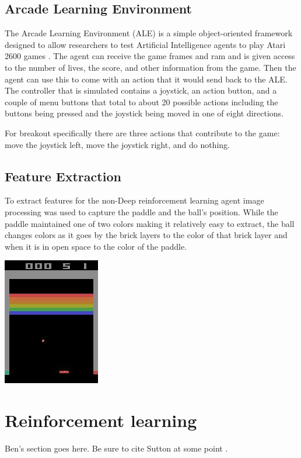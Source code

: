\documentclass{article}
\begin{document}
\subsection{Arcade Learning Environment}
The Arcade Learning Environment (ALE) is a simple object-oriented framework designed to allow researchers to test Artificial Intelligence agents to play Atari 2600 games \cite{ale}. The agent can receive the game frames and ram and is given access to the number of lives, the score, and other information from the game. Then the agent can use this to come with an action that it would send back to the ALE. The controller that is simulated contains a joystick, an action button, and a couple of menu buttons that total to about 20 possible actions including the buttons being pressed and the joystick being moved in one of eight directions.

For breakout specifically there are three actions that contribute to the game: move the joystick left, move the joystick right, and do nothing.

\subsection{Feature Extraction}
To extract features for the non-Deep reinforcement learning agent image processing was used to capture the paddle and the ball's position. While the paddle maintained one of two colors making it relatively easy to extract, the ball changes colors as it goes by the brick layers to the color of that brick layer and when it is in open space to the color of the paddle. 

  \begin{center}
  \includegraphics[scale=.75]{tmp2.jpg}
  \end{center}

\section{Reinforcement learning}
Ben's section goes here. Be sure to cite Sutton at some point \cite{sutton}.
\end{document}
